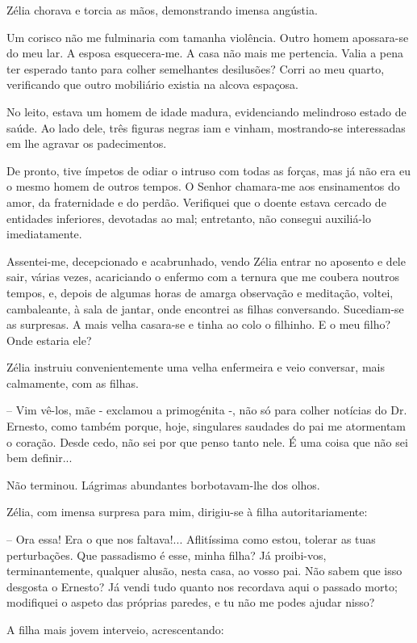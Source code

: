 \documentclass[portuguese,12pt,a4paper]{scrbook}
\begin{document}
	Zélia chorava e torcia as mãos, demonstrando imensa angústia.
	
	Um corisco não me fulminaria com tamanha violência. Outro homem apossara-se do meu lar. A esposa esquecera-me. A casa não mais me pertencia. Valia a pena ter esperado tanto para colher semelhantes desilusões? Corri ao meu quarto, verificando que outro mobiliário existia na alcova espaçosa.
	
	No leito, estava um homem de idade madura, evidenciando melindroso estado de saúde. Ao lado dele, três figuras negras iam e vinham, mostrando-se interessadas em lhe agravar os padecimentos.
	
	
	De pronto, tive ímpetos de odiar o intruso com todas as forças, mas já não era eu o mesmo homem de outros tempos. O Senhor chamara-me aos ensinamentos do amor, da fraternidade e do perdão. Verifiquei que o doente estava cercado de entidades inferiores, devotadas ao mal; entretanto, não consegui auxiliá-lo imediatamente.
	
	Assentei-me, decepcionado e acabrunhado, vendo Zélia entrar no aposento e dele sair, várias vezes, acariciando o enfermo com a ternura que me coubera noutros tempos, e, depois de algumas horas de amarga observação e meditação, voltei, cambaleante, à sala de jantar, onde encontrei as filhas conversando. Sucediam-se as surpresas. A mais velha casara-se e tinha ao colo o filhinho. E o meu filho? Onde estaria ele?
	
	Zélia instruiu convenientemente uma velha enfermeira e veio conversar, mais calmamente, com as filhas.
	
	– Vim vê-los, mãe - exclamou a primogénita -, não só para colher notícias do Dr. Ernesto, como também porque, hoje, singulares saudades do pai me atormentam o coração. Desde cedo, não sei por que penso tanto nele. É uma coisa que não sei bem definir...
	
	Não terminou. Lágrimas abundantes borbotavam-lhe dos olhos.
	
	Zélia, com imensa surpresa para mim, dirigiu-se à filha autoritariamente:
	
	– Ora essa! Era o que nos faltava!... Aflitíssima como estou, tolerar as tuas perturbações. Que passadismo é esse, minha filha? Já proibi-vos, terminantemente, qualquer alusão, nesta casa, ao vosso pai. Não sabem que isso desgosta o Ernesto? Já vendi tudo quanto nos recordava aqui o passado morto; modifiquei o aspeto das próprias paredes, e tu não me podes ajudar nisso?
	
	A filha mais jovem interveio, acrescentando:
	
\end{document}

